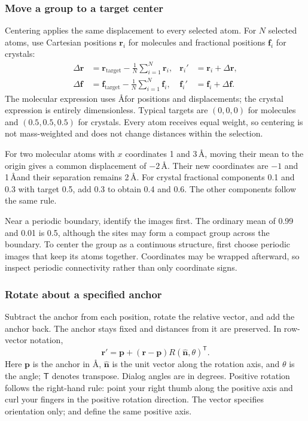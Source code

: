 \subsubsection{Move a group to a target center}

Centering applies the same displacement to every selected atom. For $N$ selected atoms, use Cartesian positions $\mathbf r_i$ for molecules and fractional positions $\mathbf f_i$ for crystals:
\begin{equation}
 \begin{aligned}
 \Delta\mathbf r&=\mathbf r_{\mathrm{target}}-
        \frac1N\sum_{i=1}^{N}\mathbf r_i,
 &\mathbf r_i'&=\mathbf r_i+\Delta\mathbf r,\\
 \Delta\mathbf f&=\mathbf f_{\mathrm{target}}-
        \frac1N\sum_{i=1}^{N}\mathbf f_i,
 &\mathbf f_i'&=\mathbf f_i+\Delta\mathbf f.
 \end{aligned}
 \label{eq:center-selected-atoms}
\end{equation}
The molecular expression uses \AA for positions and displacements; the crystal expression is entirely dimensionless. Typical targets are $(0,0,0)$ for molecules and $(0.5,0.5,0.5)$ for crystals. Every atom receives equal weight, so centering is not mass-weighted and does not change distances within the selection.

For two molecular atoms with $x$ coordinates 1 and 3\,\AA, moving their mean to the origin gives a common displacement of $-2\,\text{\AA}$. Their new coordinates are $-1$ and 1\,\AA and their separation remains 2\,\AA. For crystal fractional components 0.1 and 0.3 with target 0.5, add 0.3 to obtain 0.4 and 0.6. The other components follow the same rule.

Near a periodic boundary, identify the images first. The ordinary mean of 0.99 and 0.01 is 0.5, although the sites may form a compact group across the boundary. To center the group as a continuous structure, first choose periodic images that keep its atoms together. Coordinates may be wrapped afterward, so inspect periodic connectivity rather than only coordinate signs.

\subsubsection{Rotate about a specified anchor}

Subtract the anchor from each position, rotate the relative vector, and add the anchor back. The anchor stays fixed and distances from it are preserved. In row-vector notation,
\begin{equation}
 \mathbf r'=\mathbf p+(\mathbf r-\mathbf p)
              R(\hat{\mathbf n},\theta)^{\mathsf T}.
 \label{eq:rotate-row-position}
\end{equation}
Here $\mathbf p$ is the anchor in \AA, $\hat{\mathbf n}$ is the unit vector along the rotation axis, and $\theta$ is the angle; $\mathsf T$ denotes transpose. Dialog angles are in degrees. Positive rotation follows the right-hand rule: point your right thumb along the positive axis and curl your fingers in the positive rotation direction. The vector specifies orientation only;  and  define the same positive axis.

